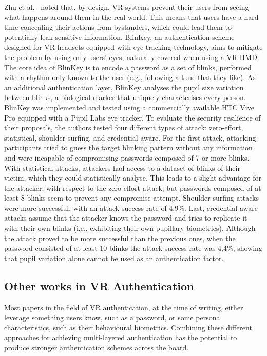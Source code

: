 \documentclass[journal]{IEEEtran}
\begin{document}
Zhu et al.~\cite{zhu2020} noted that, by design, VR systems prevent their users from seeing what happens around them in the real world. This means that users have a hard time concealing their actions from bystanders, which could lead them to potentially leak sensitive information. BlinKey, an authentication scheme designed for VR headsets equipped with eye-tracking technology, aims to mitigate the problem by using only users' eyes, naturally covered when using a VR HMD. The core idea of BlinKey is to encode a password as a set of blinks, performed with a rhythm only known to the user (e.g., following a tune that they like). As an additional authentication layer, BlinKey analyses the pupil size variation between blinks, a biological marker that uniquely characterises every person. BlinKey was implemented and tested using a commercially available HTC Vive Pro equipped with a Pupil Labs eye tracker. To evaluate the security resilience of their proposals, the authors tested four different types of attack: zero-effort, statistical, shoulder surfing, and credential-aware. For the first attack, attacking participants tried to guess the target blinking pattern without any information and were incapable of compromising passwords composed of 7 or more blinks. With statistical attacks, attackers had access to a dataset of blinks of their victim, which they could statistically analyse. This leads to a slight advantage for the attacker, with respect to the zero-effort attack, but passwords composed of at least 8 blinks seem to prevent any compromise attempt. Shoulder-surfing attacks were more successful, with an attack success rate of 4.9\%. Last, credential-aware attacks assume that the attacker knows the password and tries to replicate it with their own blinks (i.e., exhibiting their own pupillary biometrics). Although the attack proved to be more successful than the previous ones, when the password consisted of at least 10 blinks the attack success rate was 4,4\%, showing that pupil variation alone cannot be used as an authentication factor.



\subsection{Other works in VR Authentication}
Most papers in the field of VR authentication, at the time of writing, either leverage something users know, such as a password, or some personal characteristics, such as their behavioural biometrics. Combining these different approaches for achieving multi-layered authentication has the potential to produce stronger authentication schemes across the board. 
\end{document}
